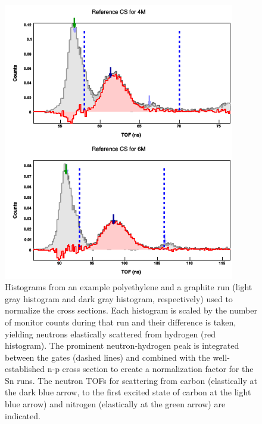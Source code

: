 \begin{figure}
    \includegraphics[width = 0.9\textwidth]{figures/polyethyleneRef.png}
    \caption{Histograms from an example polyethylene and a graphite run (light gray
        histogram and dark gray histogram, respectively) used to normalize the
        cross sections. Each histogram is scaled by the number of monitor counts during
        that run and their difference is taken, yielding neutrons elastically scattered
        from hydrogen (red histogram). The prominent neutron-hydrogen peak is
        integrated between the gates (dashed lines) and combined with the
        well-established n-p cross section to create a normalization factor for
        the Sn runs. The neutron TOFs for scattering from carbon (elastically at the dark blue
        arrow, to the first excited state of carbon at the light blue arrow)
        and nitrogen (elastically at the green arrow) are indicated.} \label{polyethyleneRef}
\end{figure}

